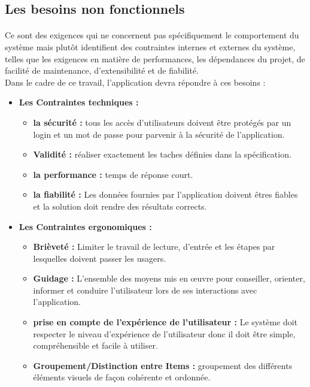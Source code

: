 \documentclass[12pt, openany]{report}
\begin{document}
 \subsection{Les besoins non fonctionnels}
\paragraph{} 
Ce sont des exigences qui ne concernent pas spécifiquement le comportement du système
mais plutôt identifient des contraintes internes et externes du système, telles que les exigences en matière de performances, les dépendances du projet, de facilité de maintenance, d’extensibilité et de fiabilité. \\
Dans le cadre de ce travail, l'application devra répondre à ces besoins : \\
\begin{itemize}\renewcommand {\labelitemi }{$\bullet $}
	\item \textbf{Les Contraintes techniques :}
	\begin{itemize}
		\vspace{5mm}
		\item \textbf{la sécurité :} tous les accès d'utilisateurs doivent être protégés par un login et un mot de passe pour parvenir à la sécurité de l'application.
		\item \textbf{Validité :} réaliser exactement les taches définies dans la spécification.
		\item \textbf{la performance :} temps de réponse court.
		\item \textbf{la fiabilité :} Les données fournies par l'application doivent êtres fiables et la solution doit rendre des résultats corrects.
		\vspace{5mm}
	\end{itemize}
\item \textbf{Les Contraintes ergonomiques :}
	\begin{itemize}
		\vspace{5mm}
		\item \textbf{Brièveté :} Limiter le travail de lecture, d'entrée et les étapes par lesquelles doivent passer les usagers.
		\item \textbf{Guidage :} L'ensemble des moyens mis en œuvre pour conseiller, orienter, informer et conduire l'utilisateur lors de ses interactions avec l'application.
		\item \textbf{prise en compte de l'expérience de l'utilisateur :} Le système doit respecter le niveau d'expérience de l'utilisateur donc il doit être simple, compréhensible et facile à utiliser.
		\item \textbf{Groupement/Distinction entre Items :} groupement des différents éléments visuels de façon cohérente et ordonnée.
	\end{itemize}
\end{itemize}
\end{document}
